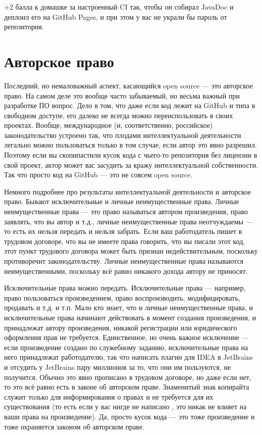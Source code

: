 \documentclass[a5paper]{article}
\begin{document}
+2 балла к домашке за настроенный CI так, чтобы он собирал JavaDoc и деплоил его на GitHub Pages, и при этом у вас не украли бы пароль от репозитория.

\section{Авторское право}

Последний, но немаловажный аспект, касающийся open source --- это авторское право. На самом деле это вообще часто забываемый, но весьма важный при разработке ПО вопрос. Дело в том, что даже если код лежит на GitHub и типа в свободном доступе, его далеко не всегда можно переиспользовать в своих проектах. Вообще, международное (и, соответственно, российское) законодательство устроено так, что плодами интеллектуальной деятельности легально можно пользоваться только в том случае, если автор это явно разрешил. Поэтому если вы скопипастили кусок кода с чьего-то репозитория без лицензии в свой проект, актор может вас засудить за кражу интеллектуальной собственности. Так что просто код на GitHub --- это не совсем open source.

Немного подробнее про результаты интеллектуальной деятельности и авторское право. Бывают исключительные и личные неимущественные права. Личные неимущественные права --- это право называться автором произведения, право заявлять, что вы автор и т.д., личные неимущественные права неотчуждаемы --- то есть их нельзя передать и нельзя забрать. Если ваш работодатель пишет в трудовом договоре, что вы не имеете права говорить, что вы писали этот код, этот пункт трудового договора может быть признан недействительным, поскольку противоречит законодательству. Личные неимущественные права называются неимущественными, поскольку всё равно никакого дохода автору не приносят.

Исключительные права можно передать. Исключительные права --- например, право пользоваться произведением, право воспроизводить, модифицировать, продавать и т.д. и т.п. Мало кто знает, что и личные неимущественные права, и исключительные права начинают действовать в момент создания произведения, и принадлежат автору произведения, никакой регистрации или юридического оформления прав не требуется. Единственное, но очень важное исключение --- если произведение создано по служебному заданию, исключительные права на него принадлежат работодателю, так что написать плагин для IDEA в JetBrains и отсудить у JetBrains пару миллионов за то, что они им пользуются, не получится. Обычно это явно прописано в трудовом договоре, но даже если нет, то это всё равно есть в законе об авторском праве. Знаменитый знак копирайта \textcopyright служит только для информирования о правах и не требуется для их существования (то есть если у вас нигде не написано \textcopyright, это никак не влияет на ваши права на произведение). Да, просто кусок кода --- это тоже произведение и тоже охраняется законом об авторском праве.
\end{document}
